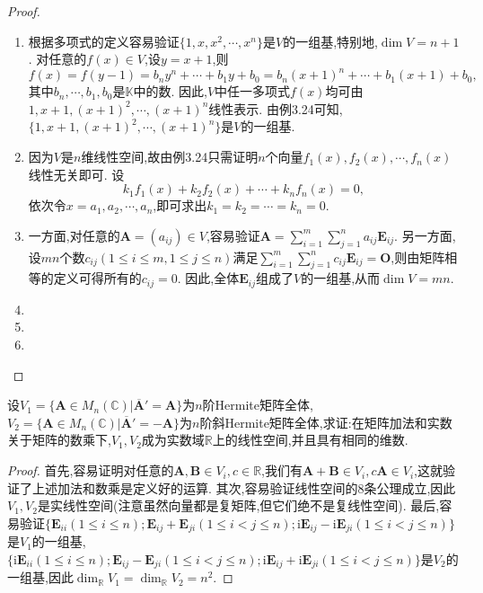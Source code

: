 \documentclass[../../main.tex]{subfiles}%
\begin{document}
\begin{proof}
\begin{enumerate}[(1)]
\item 根据多项式的定义容易验证\(\{1,x,x^2,\cdots,x^n\}\)是\(V\)的一组基,特别地,\(\dim V=n + 1\). 对任意的\(f(x)\in V\),设\(y=x + 1\),则
\[
f(x)=f(y - 1)=b_ny^n+\cdots+b_1y + b_0=b_n(x + 1)^n+\cdots+b_1(x + 1)+b_0,
\]
其中\(b_n,\cdots,b_1,b_0\)是\(\mathbb{K}\)中的数. 因此,\(V\)中任一多项式\(f(x)\)均可由\(1,x + 1,(x + 1)^2,\cdots,(x + 1)^n\)线性表示. 由例3.24可知,\(\{1,x + 1,(x + 1)^2,\cdots,(x + 1)^n\}\)是\(V\)的一组基.
\item 因为\(V\)是\(n\)维线性空间,故由例3.24只需证明\(n\)个向量\(f_1(x),f_2(x),\cdots,f_n(x)\)线性无关即可. 设
\[
k_1f_1(x)+k_2f_2(x)+\cdots+k_nf_n(x)=0,
\]
依次令\(x = a_1,a_2,\cdots,a_n\),即可求出\(k_1 = k_2=\cdots=k_n = 0\). 
\item 一方面,对任意的\(\boldsymbol{A}=(a_{ij})\in V\),容易验证\(\boldsymbol{A}=\sum_{i = 1}^{m}\sum_{j = 1}^{n}a_{ij}\boldsymbol{E}_{ij}\). 另一方面,设\(mn\)个数\(c_{ij}(1\leqslant  i\leqslant  m,1\leqslant  j\leqslant  n)\)满足\(\sum_{i = 1}^{m}\sum_{j = 1}^{n}c_{ij}\boldsymbol{E}_{ij}=\boldsymbol{O}\),则由矩阵相等的定义可得所有的\(c_{ij}=0\). 因此,全体\(\boldsymbol{E}_{ij}\)组成了\(V\)的一组基,从而\(\dim V = mn\).
\item 
\item 
\item 
\end{enumerate}

\end{proof}

\begin{example}[$\,\,$\(n\)阶(斜)Hermite矩阵全体构成的线性空间]\label{example:n阶(斜)Hermite矩阵全体构成的线性空间}

设\(V_1 = \{ \boldsymbol{A} \in M_n(\mathbb{C})|\overline{\boldsymbol{A}}'=\boldsymbol{A}\}\)为\(n\)阶Hermite矩阵全体,\(V_2 = \{ \boldsymbol{A} \in M_n(\mathbb{C})|\overline{\boldsymbol{A}}'=-\boldsymbol{A}\}\)为\(n\)阶斜Hermite矩阵全体,求证:在矩阵加法和实数关于矩阵的数乘下,\(V_1,V_2\)成为实数域\(\mathbb{R}\)上的线性空间,并且具有相同的维数.
\end{example}
\begin{proof}

首先,容易证明对任意的\(\boldsymbol{A},\boldsymbol{B} \in V_i,c \in \mathbb{R}\),我们有\(\boldsymbol{A}+\boldsymbol{B} \in V_i,c\boldsymbol{A} \in V_i\),这就验证了上述加法和数乘是定义好的运算. 其次,容易验证线性空间的8条公理成立,因此\(V_1,V_2\)是实线性空间(注意虽然向量都是复矩阵,但它们绝不是复线性空间). 最后,容易验证\(\{\boldsymbol{E}_{ii}(1\leqslant  i\leqslant  n);\boldsymbol{E}_{ij}+\boldsymbol{E}_{ji}(1\leqslant  i< j\leqslant  n);\mathrm{i}\boldsymbol{E}_{ij}-\mathrm{i}\boldsymbol{E}_{ji}(1\leqslant  i< j\leqslant  n)\}\)是\(V_1\)的一组基,\(\{\mathrm{i}\boldsymbol{E}_{ii}(1\leqslant  i\leqslant  n);\boldsymbol{E}_{ij}-\boldsymbol{E}_{ji}(1\leqslant  i< j\leqslant  n);\mathrm{i}\boldsymbol{E}_{ij}+\mathrm{i}\boldsymbol{E}_{ji}(1\leqslant  i< j\leqslant  n)\}\)是\(V_2\)的一组基,因此\(\dim_{\mathbb{R}}V_1=\dim_{\mathbb{R}}V_2=n^2\).

\end{proof}
\end{document}
